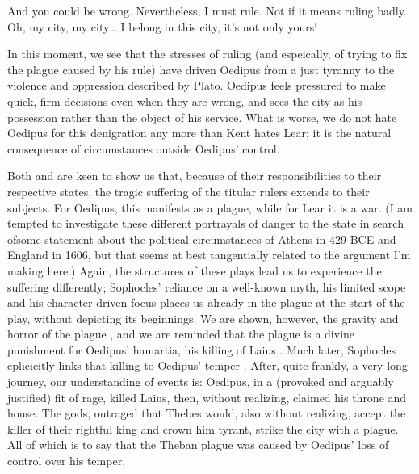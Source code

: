 \begin{minipage}[t]{0.8\linewidth}
  \begin{dialogue}
     And you could be wrong.
     Nevertheless, I must rule.
     Not if it means ruling badly.
     Oh, my city, my city\ldots{}
     I belong in this city, it's not only yours!

  \end{dialogue}
\end{minipage}

\vspace{0.5\baselineskip}

In this moment, we see that the stresses of ruling (and espeically, of trying to
fix the plague caused by his rule) have driven Oedipus from a just tyranny to
the violence and oppression described by Plato. Oedipus feels pressured to make
quick, firm decisions even when they are wrong, and sees the city as his
possession rather than the object of his service. What is worse, we do not hate
Oedipus for this denigration any more than Kent hates Lear; it is the natural
consequence of circumstances outside Oedipus' control.


Both \lear{} and \oedipus{} are keen to show us that, because of their
responsibilities to their respective states, the tragic suffering of the titular
rulers extends to their subjects. For Oedipus, this manifests as a plague, while
for Lear it is a war. (I am tempted to investigate these different portrayals of
danger to the state in search ofsome statement about the political circumstances
of Athens in 429 BCE and England in 1606, but that seems at best tangentially
related to the argument I'm making here.) Again, the structures of these plays
lead us to experience the suffering differently; Sophocles' reliance on a
well-known myth, his limited scope and his character-driven focus places us
already in the plague at the start of the play, without depicting its
beginnings. We are shown, however, the gravity and horror of the plague
\parencite[e.g. ll. 22--30]{oedipus}, and we are reminded that the plague is a
divine punishment for Oedipus' hamartia, his killing of Laius
\parencite[ll. 101--110]{oedipus}. Much later, Sophocles eplicicitly links that
killing to Oedipus' temper \parencite[ll. 807--813]{oedipus}. After, quite
frankly, a very long journey, our understanding of events is: Oedipus, in a
(provoked and arguably justified) fit of rage, killed Laius, then, without
realizing, claimed his throne and house. The gods, outraged that Thebes would,
also without realizing, accept the killer of their rightful king and crown him
tyrant, strike the city with a plague. All of which is to say that the Theban
plague was caused by Oedipus' loss of control over his temper.


